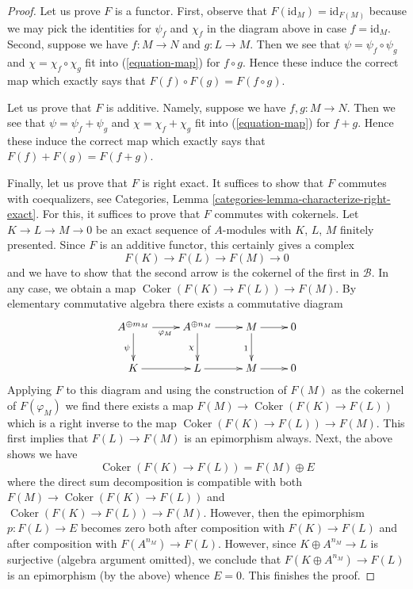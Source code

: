 \documentclass{stacks-project}
\theoremstyle{plain}
\theoremstyle{definition}
\theoremstyle{remark}
\numberwithin{equation}{subsection}
\def\Coker{\mathop{\mathrm{Coker}}}
\begin{document}
\begin{proof}
\medskip\noindent
Let us prove $F$ is a functor. First, observe that
$F(\text{id}_M) = \text{id}_{F(M)}$ because we may pick
the identities for $\psi_f$ and $\chi_f$ in the diagram above
in case $f = \text{id}_M$. Second, suppose we have
$f : M \to N$ and $g : L \to M$. Then we see that
$\psi = \psi_f \circ \psi_g$ and $\chi = \chi_f \circ \chi_g$
fit into (\ref{equation-map}) for $f \circ g$.
Hence these induce the correct map which exactly
says that $F(f) \circ F(g) = F(f \circ g)$.

\medskip\noindent
Let us prove that $F$ is additive. Namely, suppose we have
$f, g : M \to N$. Then we see that $\psi = \psi_f + \psi_g$ and
$\chi = \chi_f + \chi_g$ fit into (\ref{equation-map}) for $f + g$.
Hence these induce the correct map which exactly
says that $F(f) + F(g) = F(f + g)$.

\medskip\noindent
Finally, let us prove that $F$ is right exact. It suffices to show that $F$
commutes with coequalizers, see
Categories, Lemma \ref{categories-lemma-characterize-right-exact}.
For this, it suffices to prove that $F$ commutes with cokernels.
Let $K \to L \to M \to 0$ be an exact sequence of $A$-modules
with $K$, $L$, $M$ finitely presented. Since $F$ is an additive
functor, this certainly gives a complex
$$
F(K) \to F(L) \to F(M) \to 0
$$
and we have to show that the second arrow is the cokernel of the first
in $\mathcal{B}$. In any case, we obtain a map
$\Coker(F(K) \to F(L)) \to F(M)$.
By elementary commutative algebra there exists a commutative diagram
$$
\xymatrix{
A^{\oplus m_M} \ar[r]_{\varphi_M} \ar[d]_\psi &
A^{\oplus n_M} \ar[r] \ar[d]_\chi &
M \ar[r] \ar[d]_1 & 0 \\
K \ar[r] &
L \ar[r] &
M \ar[r] & 0
}
$$
Applying $F$ to this diagram and using the construction of $F(M)$ as
the cokernel of $F(\varphi_M)$ we find there exists a map
$F(M) \to \Coker(F(K) \to F(L))$ which is a right inverse
to the map $\Coker(F(K) \to F(L)) \to F(M)$. This first implies
that $F(L) \to F(M)$ is an epimorphism always. Next, the above shows
we have
$$
\Coker(F(K) \to F(L)) = F(M) \oplus E
$$
where the direct sum decomposition is compatible with both
$F(M) \to \Coker(F(K) \to F(L))$ and $\Coker(F(K) \to F(L)) \to F(M)$.
However, then the epimorphism $p : F(L) \to E$ becomes zero both
after composition with $F(K) \to F(L)$ and after composition
with $F(A^{n_M}) \to F(L)$. However, since $K \oplus A^{n_M} \to L$
is surjective (algebra argument omitted), we conclude that
$F(K \oplus A^{n_M}) \to F(L)$ is an epimorphism (by the above)
whence $E = 0$. This finishes the proof.
\end{proof}
\end{document}
